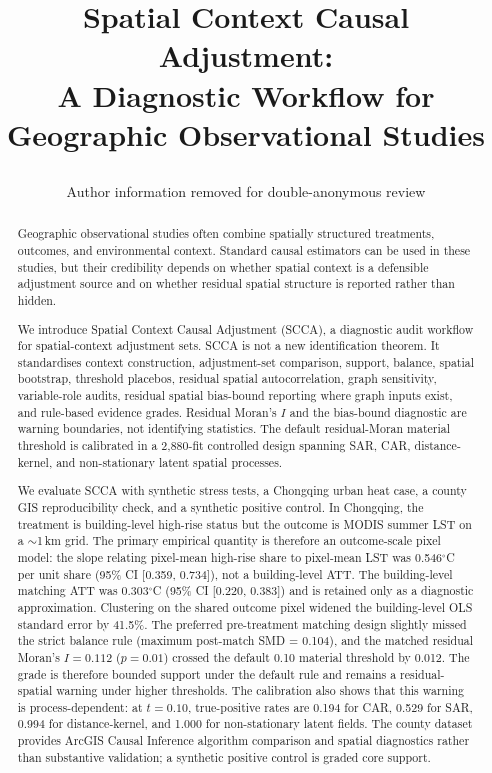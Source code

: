 \documentclass{article}
\begin{document}
\title{\parbox{0.9\textwidth}{\centering Spatial Context Causal Adjustment:\\A Diagnostic Workflow for Geographic Observational Studies}}

\author{Author information removed for double-anonymous review}

\date{}
\maketitle

\begin{abstract}
Geographic observational studies often combine spatially structured treatments, outcomes, and environmental context. Standard causal estimators can be used in these studies, but their credibility depends on whether spatial context is a defensible adjustment source and on whether residual spatial structure is reported rather than hidden.

We introduce Spatial Context Causal Adjustment (SCCA), a diagnostic audit workflow for spatial-context adjustment sets. SCCA is not a new identification theorem. It standardises context construction, adjustment-set comparison, support, balance, spatial bootstrap, threshold placebos, residual spatial autocorrelation, graph sensitivity, variable-role audits, residual spatial bias-bound reporting where graph inputs exist, and rule-based evidence grades. Residual Moran's $I$ and the bias-bound diagnostic are warning boundaries, not identifying statistics. The default residual-Moran material threshold is calibrated in a 2{,}880-fit controlled design spanning SAR, CAR, distance-kernel, and non-stationary latent spatial processes.

We evaluate SCCA with synthetic stress tests, a Chongqing urban heat case, a county GIS reproducibility check, and a synthetic positive control. In Chongqing, the treatment is building-level high-rise status but the outcome is MODIS summer LST on a $\sim$1\,km grid. The primary empirical quantity is therefore an outcome-scale pixel model: the slope relating pixel-mean high-rise share to pixel-mean LST was 0.546$^\circ$C per unit share (95\% CI [0.359, 0.734]), not a building-level ATT. The building-level matching ATT was 0.303$^\circ$C (95\% CI [0.220, 0.383]) and is retained only as a diagnostic approximation. Clustering on the shared outcome pixel widened the building-level OLS standard error by 41.5\%. The preferred pre-treatment matching design slightly missed the strict balance rule (maximum post-match SMD = 0.104), and the matched residual Moran's $I = 0.112$ ($p=0.01$) crossed the default 0.10 material threshold by 0.012. The grade is therefore bounded support under the default rule and remains a residual-spatial warning under higher thresholds. The calibration also shows that this warning is process-dependent: at $t=0.10$, true-positive rates are 0.194 for CAR, 0.529 for SAR, 0.994 for distance-kernel, and 1.000 for non-stationary latent fields. The county dataset provides ArcGIS Causal Inference algorithm comparison and spatial diagnostics rather than substantive validation; a synthetic positive control is graded core support.


\end{abstract}
\end{document}
